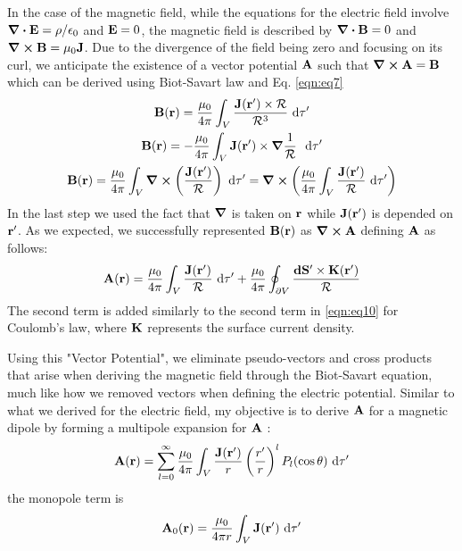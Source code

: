 \documentclass{article}
\numberwithin{equation}{section}
\begin{document}
In the case of the magnetic field, while the equations for the electric field involve $\div\vb{E}=\rho/\epsilon_0$ and $\vb{E}=0$, the magnetic field is described by $\div\vb{B}=0$ and $\curl\vb{B}=\mu_0\vb{J}$. Due to the divergence of the field being zero and focusing on its curl, we anticipate the existence of a vector potential $\vb{A}$ such that $\curl\vb{A}=\vb{B}$ which can be derived using Biot-Savart law and Eq. \eqref{eqn:eq7}
%
\begin{gather}
    \vb{B}(\vb{r})=\frac{\mu_0}{4\pi} \int_V \frac {\vb{J}(\vb{r'})\times\vb{\mathcal{R}}} {\mathcal{R}^3} \ \dd\tau'\label{eqn:eq12}\\ \vb{B}(\vb{r})=-\frac{\mu_0}{4\pi} \int_V \vb{J}(\vb{r'})\times\grad\frac{1}{\mathcal{R}}\ \ \dd\tau' \nonumber \\ \vb{B}(\vb{r})=\frac{\mu_0}{4\pi} \int_V \curl\left( \frac{\vb{J}(\vb{r'})}{\mathcal{R}} \right) \ \dd\tau'=\curl\left(\frac{\mu_0}{4\pi} \int_V \frac{\vb{J}(\vb{r'})}{\mathcal{R}} \ \dd\tau'\right) \label{eqn:eq13}
\end{gather}
%
In the last step we used the fact that $\grad$ is taken on $\vb{r}$ while $\vb{J}(\vb{r'})$ is depended on $\vb{r'}$. As we expected, we successfully represented $\vb{B}(\vb{r})$ as $\curl\vb{A}$ defining $\vb{A}$ as follows:
%
\begin{equation}
\label{eqn:eq14}
    \vb{A}(\vb{r})=\frac{\mu_0}{4\pi} \int_V \frac {\vb{J}(\vb{r'})} {\mathcal{R}} \ \dd\tau'+\frac{\mu_0}{4\pi} \oint_{\partial V} \frac{\vb{dS'}\times\vb{K}(\vb{r'})}{\mathcal{R}}
\end{equation}
%
The second term is added similarly to the second term in \eqref{eqn:eq10} for Coulomb's law, where $\vb{K}$ represents the surface current density.
\par
Using this "Vector Potential", we eliminate pseudo-vectors and cross products that arise when deriving the magnetic field through the Biot-Savart equation, much like how we removed vectors when defining the electric potential. Similar to what we derived for the electric field, my objective is to derive $\vb{A}$ for a magnetic dipole by forming a multipole expansion for $\vb{A}$ :
%
\begin{equation}
\label{eqn:eq15}
    \vb{A}(\vb{r})=\sum_{l=0}^\infty \frac{\mu_0}{4\pi} \int_V \frac{\vb{J}(\vb{r'})}{r} \left( \frac{r'}{r} \right)^l P_l(\cos\theta) \ \dd\tau'
\end{equation}
%
the monopole term is
%
\begin{equation}
\label{eqn:eq16}
    \vb{A}_0(\vb{r}) =\frac{\mu_0}{4\pi r} \int_V \vb{J}(\vb{r'})\ \dd\tau'
\end{equation}
\end{document}
